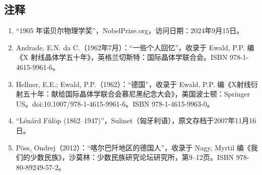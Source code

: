 \subsection{注释}
\begin{enumerate}
\item  “1905 年诺贝尔物理学奖”，NobelPrize.org，访问日期：2024年9月15日。
\item  Andrade, E.N. da C.（1962年7月）：“一些个人回忆”，收录于 Ewald, P.P. 编《X 射线晶体学五十年》，英格兰切斯特：国际晶体学联合会。ISBN 978-1-4615-9961-6。
\item   Hellner, E.E.; Ewald, P.P.（1962）：“德国”，收录于 Ewald, P.P. 编《X射线衍射五十年：献给国际晶体学联合会慕尼黑纪念大会》，美国波士顿：Springer US。doi:10.1007/978-1-4615-9961-6。ISBN 978-1-4615-9963-0。
\item  “Lénárd Fülöp (1862–1947)”，Sulinet（匈牙利语），原文存档于2007年11月16日。
\item  Pöss, Ondrej（2012）：“喀尔巴阡地区的德国人”，收录于 Nagy, Myrtil 编《我们的少数民族》，沙莫林：少数民族研究论坛研究所，第9–12页。ISBN 978-80-89249-57-2。
\end{enumerate}
